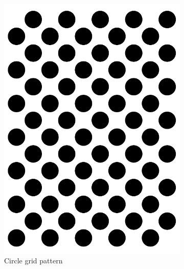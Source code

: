 \begin{figure}[H]
\begin{subfigure}[b]{0.24\textwidth}
    \includegraphics[width=\textwidth]{images/registration/circle_pattern.png}
    \caption{Circle grid pattern}
    \label{figure:circle_pattern}
  \end{subfigure}
  \hfill
  \begin{subfigure}[b]{0.24\textwidth}

\end{subfigure}
\end{figure}
